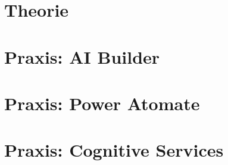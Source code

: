 
\section{Theorie}







\section{Praxis: AI Builder}



\section{Praxis: Power Atomate}



\section{Praxis: Cognitive Services}


